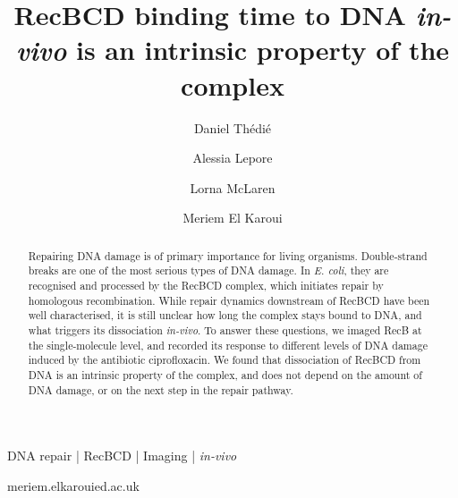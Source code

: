 \documentclass[times, twoside]{zHenriquesLab-StyleBioRxiv}
\newcommand{\ecoli}{\textit{E. coli}}
\begin{document}
\title{RecBCD binding time to DNA \emph{in-vivo} is an intrinsic property of the complex}

\author[1]{Daniel Thédié}
\author[2]{Alessia Lepore}
\author[1]{Lorna McLaren}
\author[1,3]{Meriem El Karoui}



\maketitle

\begin{abstract}
Repairing DNA damage is of primary importance for living organisms. Double-strand breaks are one of the most serious types of DNA damage. In \ecoli, they are recognised and processed by the RecBCD complex, which initiates repair by homologous recombination.
While repair dynamics downstream of RecBCD have been well characterised, it is still unclear how long the complex stays bound to DNA, and what triggers its dissociation \emph{in-vivo}.
To answer these questions, we imaged RecB at the single-molecule level, and recorded its response to different levels of DNA damage induced by the antibiotic ciprofloxacin.
We found that dissociation of RecBCD from DNA is an intrinsic property of the complex, and does not depend on the amount of DNA damage, or on the next step in the repair pathway.


\end{abstract}

\begin{keywords}
    DNA repair | RecBCD | Imaging | \emph{in-vivo}
\end{keywords}

\begin{corrauthor}
    meriem.elkaroui\at ed.ac.uk
\end{corrauthor}






\end{document}
